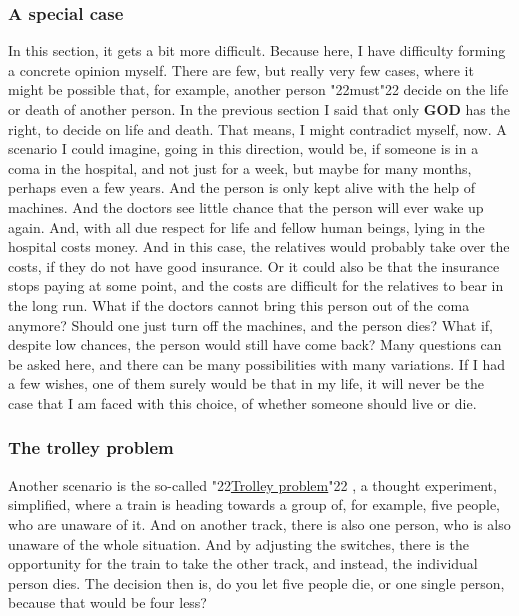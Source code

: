 \documentclass[10pt,a5paper]{article}
\newcommand{\God}[0]{\textbf{GOD}}
\newcommand{\q}[1]{\char"22{#1}\char"22 }
\begin{document}
	\subsubsection{A special case}
		In this section,
		it gets a bit more difficult.
		Because here,
		I have difficulty forming a concrete opinion myself.
		There are few,
		but really very few cases,
		where it might be possible that,
		for example,
		another person \q{must} decide on the life or death of another person.
		In the previous section I said that only {\God} has the right,
		to decide on life and death.
		That means,
		I might contradict myself,
		now.
		A scenario I could imagine,
		going in this direction,
		would be,
		if someone is in a coma in the hospital,
		and not just for a week,
		but maybe for many months,
		perhaps even a few years.
		And the person is only kept alive with the help of machines.
		And the doctors see little chance that the person will ever wake up again.
		And,
		with all due respect for life and fellow human beings,
		lying in the hospital costs money.
		And in this case,
		the relatives would probably take over the costs,
		if they do not have good insurance.
		Or it could also be that the insurance stops paying at some point,
		and the costs are difficult for the relatives to bear in the long run.
		What if the doctors cannot bring this person out of the coma anymore?
		Should one just turn off the machines,
		and the person dies?
		What if,
		despite low chances,
		the person would still have come back?
		Many questions can be asked here,
		and there can be many possibilities with many variations.
		If I had a few wishes,
		one of them surely would be that in my life,
		it will never be the case that I am faced with this choice,
		of whether someone should live or die.
		
	\subsubsection{The trolley problem}
		Another scenario is the so-called \q{\href{https://en.wikipedia.org/wiki/Trolley_problem}{Trolley problem}},
		a thought experiment,
		simplified,
		where a train is heading towards a group of,
		for example,
		five people,
		who are unaware of it.
		And on another track,
		there is also one person,
		who is also unaware of the whole situation.
		And by adjusting the switches,
		there is the opportunity for the train to take the other track,
		and instead,
		the individual person dies.
		The decision then is,
		do you let five people die,
		or one single person,
		because that would be four less?
		
\end{document}
